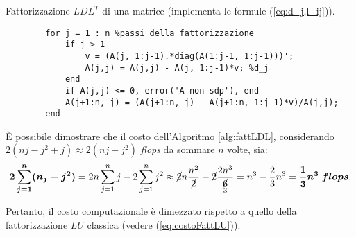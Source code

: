 \begin{algorithm}
\caption{Fattorizzazione $LDL^T$ di una matrice (implementa le formule (\ref{eq:d_j,l_ij})).}
\label{alg:fattLDL}
    \begin{lstlisting}[style=Matlab-editor]
        %A e' la matrice n*n in ingresso. La parte triangolare inferiore di questa contiene l'informazione dei fattori L e D
        for j = 1 : n %passi della fattorizzazione
            if j > 1
                v = (A(j, 1:j-1).*diag(A(1:j-1, 1:j-1)))';
                A(j,j) = A(j,j) - A(j, 1:j-1)*v; %d_j
            end
            if A(j,j) <= 0, error('A non sdp'), end
            A(j+1:n, j) = (A(j+1:n, j) - A(j+1:n, 1:j-1)*v)/A(j,j);
        end
    \end{lstlisting}
\end{algorithm}

È possibile dimostrare che il costo dell'Algoritmo \ref{alg:fattLDL}, considerando $2(nj-j^2+j)\approx 2(nj-j^2)$ \textit{flops} da sommare $n$ volte, sia:
\begin{equation}
   \boldsymbol{2\sum_{j=1}^n(n_j-j^2)}=2n\sum_{j=1}^n j - 2\sum_{j=1}^n j^2\approx \cancel{2}n \frac{n^2}{\cancel{2}} - \cancel{2}\frac{2n^3}{\underset{3}{\cancel{6}}}=n^3-\frac{2}{3}n^3=\boldsymbol{\frac{1}{3}n^3\; flops}.
\end{equation}

Pertanto, il costo computazionale è dimezzato rispetto a quello della fattorizzazione $LU$ classica (vedere (\ref{eq:costoFattLU})).

